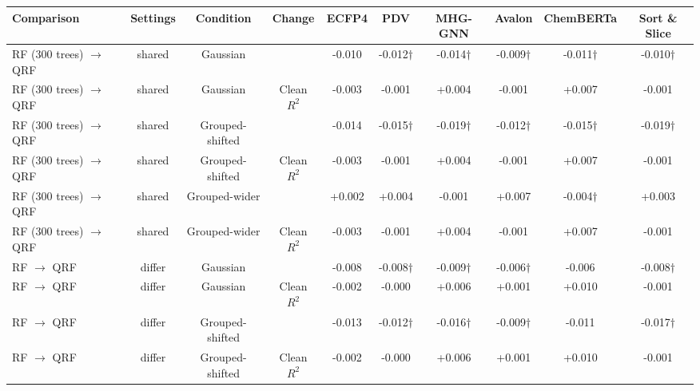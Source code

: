 \begin{table}[!htbp]
\centering
\footnotesize
\begin{adjustbox}{max width=\textwidth,max totalheight=0.78\textheight}
\begin{tabular}{lccccccccc}
\toprule
Comparison & Settings & Condition & Change & ECFP4 & PDV & MHG-GNN & Avalon & ChemBERTa & Sort \& Slice \\
\midrule
RF (300 trees) $\rightarrow$ QRF & shared & Gaussian & \aucnorm{} & -0.010 & -0.012$\dagger$ & -0.014$\dagger$ & -0.009$\dagger$ & -0.011$\dagger$ & -0.010$\dagger$ \\
RF (300 trees) $\rightarrow$ QRF & shared & Gaussian & Clean $R^2$ & -0.003 & -0.001 & +0.004 & -0.001 & +0.007 & -0.001 \\
RF (300 trees) $\rightarrow$ QRF & shared & Grouped-shifted & \aucnorm{} & -0.014 & -0.015$\dagger$ & -0.019$\dagger$ & -0.012$\dagger$ & -0.015$\dagger$ & -0.019$\dagger$ \\
RF (300 trees) $\rightarrow$ QRF & shared & Grouped-shifted & Clean $R^2$ & -0.003 & -0.001 & +0.004 & -0.001 & +0.007 & -0.001 \\
RF (300 trees) $\rightarrow$ QRF & shared & Grouped-wider & \aucnorm{} & +0.002 & +0.004 & -0.001 & +0.007 & -0.004$\dagger$ & +0.003 \\
RF (300 trees) $\rightarrow$ QRF & shared & Grouped-wider & Clean $R^2$ & -0.003 & -0.001 & +0.004 & -0.001 & +0.007 & -0.001 \\
RF $\rightarrow$ QRF & differ & Gaussian & \aucnorm{} & -0.008 & -0.008$\dagger$ & -0.009$\dagger$ & -0.006$\dagger$ & -0.006 & -0.008$\dagger$ \\
RF $\rightarrow$ QRF & differ & Gaussian & Clean $R^2$ & -0.002 & -0.000 & +0.006 & +0.001 & +0.010 & -0.001 \\
RF $\rightarrow$ QRF & differ & Grouped-shifted & \aucnorm{} & -0.013 & -0.012$\dagger$ & -0.016$\dagger$ & -0.009$\dagger$ & -0.011 & -0.017$\dagger$ \\
RF $\rightarrow$ QRF & differ & Grouped-shifted & Clean $R^2$ & -0.002 & -0.000 & +0.006 & +0.001 & +0.010 & -0.001 \\

\end{tabular}
\end{adjustbox}
\end{table}
